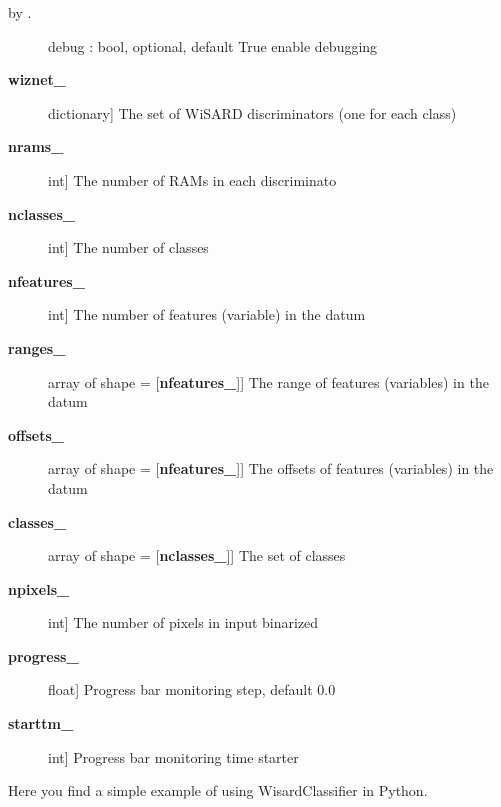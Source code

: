 \documentclass[letterpaper,10pt,english]{sphinxmanual}
\begin{document}
\begin{fulllineitems}
\begin{description}
\item[{by .}] \leavevmode
debug : bool, optional, default True
enable debugging

\end{description}
\begin{description}
\item[{{\color{red}\bfseries{}wiznet\_}}] \leavevmode{[}dictionary{]}
The set of WiSARD discriminators (one for each class)

\item[{{\color{red}\bfseries{}nrams\_}}] \leavevmode{[}int{]}
The number of RAMs in each discriminato

\item[{{\color{red}\bfseries{}nclasses\_}}] \leavevmode{[}int{]}
The number of classes

\item[{{\color{red}\bfseries{}nfeatures\_}}] \leavevmode{[}int{]}
The number of features (variable) in the datum

\item[{{\color{red}\bfseries{}ranges\_}}] \leavevmode{[}array of shape = {[}{\color{red}\bfseries{}nfeatures\_}{]}{]}
The range of features (variables) in the datum

\item[{{\color{red}\bfseries{}offsets\_}}] \leavevmode{[}array of shape = {[}{\color{red}\bfseries{}nfeatures\_}{]}{]}
The offsets of features (variables) in the datum

\item[{{\color{red}\bfseries{}classes\_}}] \leavevmode{[}array of shape = {[}{\color{red}\bfseries{}nclasses\_}{]}{]}
The set of classes

\item[{{\color{red}\bfseries{}npixels\_}}] \leavevmode{[}int{]}
The number of pixels in input binarized

\item[{{\color{red}\bfseries{}progress\_}}] \leavevmode{[}float{]}
Progress bar monitoring step, default 0.0

\item[{{\color{red}\bfseries{}starttm\_}}] \leavevmode{[}int{]}
Progress bar monitoring time starter

\end{description}

Here you find a simple example of using WisardClassifier in Python.


\end{fulllineitems}
\end{document}
